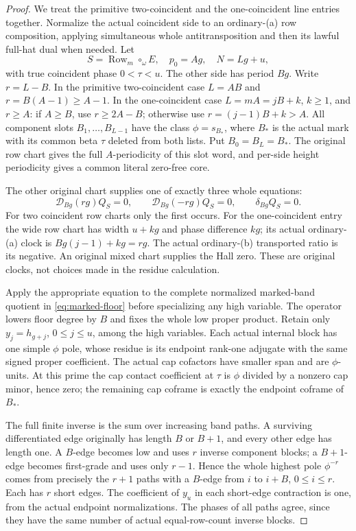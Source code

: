 \documentclass[11pt,a4paper]{amsart}
\numberwithin{equation}{section}
\theoremstyle{plain}
\theoremstyle{definition}
\newcommand{\Row}{\operatorname{Row}}
\newcommand{\DD}{\mathscr D}
\begin{document}
\begin{proof}
We treat the primitive two-coincident and the one-coincident line entries
together.  Normalize the actual coincident side to an ordinary-(a) row
composition, applying simultaneous whole antitransposition and then its
lawful full-hat dual when needed.  Let
\[
 S=\Row_m\circ_\omega E,\quad p_0=Ag,\quad
 N=Lg+u,
\]
with true coincident phase \(0<\tau<u\).  The other side has period \(Bg\).
Write \(r=L-B\).  In the primitive two-coincident case \(L=AB\) and
\(r=B(A-1)\ge A-1\).  In the one-coincident case
\(L=mA=jB+k\), \(k\ge1\), and \(r\ge A\): if \(A\ge B\), use
\(r\ge2A-B\); otherwise use \(r=(j-1)B+k>A\).
All component slots \(B_1,\ldots,B_{L-1}\) have the class
\(\phi=s_{B_*}\), where \(B_*\) is the actual mark with its common beta
\(\tau\) deleted from both lists.  Put \(B_0=B_L=B_*\).
The original row chart gives the full \(A\)-periodicity of this slot word,
and per-side height periodicity gives a common literal zero-free core.

The other original chart supplies one of exactly three whole equations:
\begin{equation}\label{eq:all-coincident-clocks}
 \DD_{Bg}(rg)Q_S=0,\qquad
 \DD_{Bg}(-rg)Q_S=0,\qquad
 \delta_{Bg}Q_S=0.
\end{equation}
For two coincident row charts only the first occurs.  For the one-coincident
entry the wide row chart has width \(u+kg\) and phase difference \(kg\);
its actual ordinary-(a) clock is
\(Bg(j-1)+kg=rg\).  The actual ordinary-(b) transported ratio is its
negative.  An original mixed chart supplies the Hall zero.  These are
original clocks, not choices made in the residue calculation.

Apply the appropriate equation to the complete normalized marked-band
quotient in \eqref{eq:marked-floor} before specializing any high variable.
The operator lowers floor degree by \(B\) and fixes the whole low proper
product.  Retain only \(y_j=h_{g+j}\), \(0\le j\le u\), among the high
variables.  Each actual internal block has one simple \(\phi\) pole, whose
residue is its endpoint rank-one adjugate with the same signed proper
coefficient.  The actual cap cofactors have smaller span and are
\(\phi\)-units.  At this prime the cap contact coefficient at \(\tau\) is
\(\phi\) divided by a nonzero cap minor, hence zero; the remaining cap
coframe is exactly the endpoint coframe of \(B_*\).

The full finite inverse is the sum over increasing band paths.  A surviving
differentiated edge originally has length \(B\) or \(B+1\), and every other
edge has length one.  A \(B\)-edge becomes low and uses \(r\) inverse component
blocks; a \(B+1\)-edge becomes first-grade and uses only \(r-1\).  Hence the
whole highest pole \(\phi^{-r}\) comes from precisely the \(r+1\) paths with
a \(B\)-edge from \(i\) to \(i+B\), \(0\le i\le r\).  Each has \(r\) short edges.
The coefficient of \(y_u\) in each short-edge contraction is one, from the
actual endpoint normalizations.  The phases of all paths agree, since
they have the same number of actual equal-row-count inverse blocks.


\end{proof}
\end{document}

